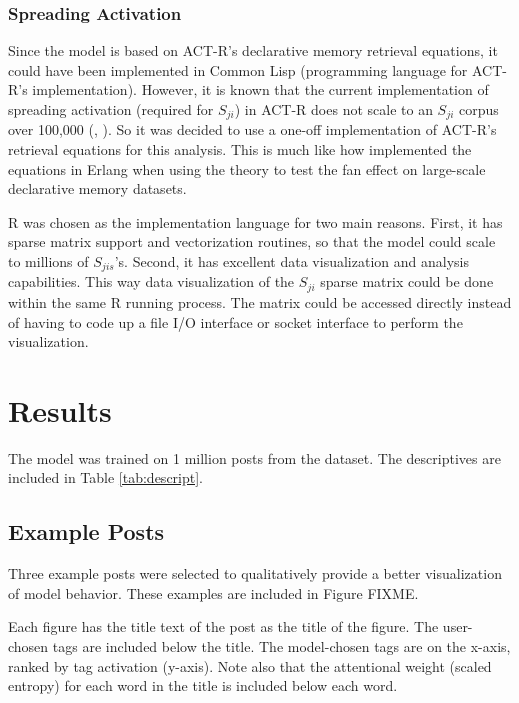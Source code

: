 \documentclass[10pt,letterpaper]{article}
\begin{document}
\subsubsection{Spreading Activation}

Since the model is based on ACT-R's declarative memory retrieval equations, it could have been implemented in Common Lisp (programming language for ACT-R's implementation).
However, it is known that the current implementation of spreading activation (required for $S_{ji}$) in ACT-R does not scale to an $S_{ji}$ corpus over 100,000 (\cite{Douglass1998}, \cite{Douglass2007}).
So it was decided to use a one-off implementation of ACT-R's retrieval equations for this analysis.
This is much like how \cite{Douglass2007} implemented the equations in Erlang when using the theory to test the fan effect on large-scale declarative memory datasets.

R was chosen as the implementation language for two main reasons.
First, it has sparse matrix support and vectorization routines, so that the model could scale to millions of $S_{jis}$'s.
Second, it has excellent data visualization and analysis capabilities. 
This way data visualization of the $S_{ji}$ sparse matrix could be done within the same R running process. 
The matrix could be accessed directly instead of having to code up a file I/O interface or socket interface to perform the visualization.

\section{Results}

The model was trained on 1 million posts from the dataset.
The descriptives are included in Table \ref{tab:descript}.

\subsection{Example Posts}

Three example posts were selected to qualitatively provide a better visualization of model behavior.
These examples are included in Figure FIXME.

Each figure has the title text of the post as the title of the figure.
The user-chosen tags are included below the title.
The model-chosen tags are on the x-axis, ranked by tag activation (y-axis).
Note also that the attentional weight (scaled entropy) for each word in the title is included below each word.
\end{document}
